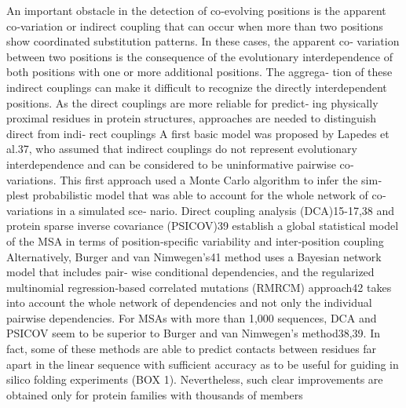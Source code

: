 	An important obstacle in the detection of co‐evolving positions is the apparent co‐variation or indirect coupling that can occur when more than two positions show coordinated substitution patterns. In these cases, the apparent co‐ variation between two positions is the consequence of the evolutionary interdependence of both positions with one or more additional positions. The aggrega‐ tion of these indirect couplings can make it difficult to recognize the directly interdependent positions.
	As the direct couplings are more reliable for predict‐ ing physically proximal residues in protein structures, approaches are needed to distinguish direct from indi‐ rect couplings \cite{de2013emerging}
	A first basic model was proposed by Lapedes et al.37, who assumed that indirect couplings do not represent evolutionary interdependence and can be considered to be uninformative pairwise co‐variations. This first approach used a Monte Carlo algorithm to infer the sim‐ plest probabilistic model that was able to account for the whole network of co‐variations in a simulated sce‐ nario.  \cite{de2013emerging}
	Direct coupling analysis (DCA)15-17,38 and protein sparse inverse covariance (PSICOV)39 establish a global statistical model of the MSA in terms of position‐specific variability and inter‐position coupling \cite{de2013emerging}
	Alternatively, Burger and van Nimwegen's41 method uses a Bayesian network model that includes pair‐ wise conditional dependencies, and the regularized multinomial regression‐based correlated mutations (RMRCM) approach42 takes into account the whole network of dependencies and not only the individual pairwise dependencies. \cite{de2013emerging}
	For MSAs with more than 1,000 sequences, DCA and PSICOV seem to be superior to Burger and van Nimwegen's method38,39. \cite{de2013emerging}
	In fact, some of these methods are able to predict contacts between residues far apart in the linear sequence with sufficient accuracy as to be useful for guiding in silico folding experiments (BOX 1). Nevertheless, such clear improvements are obtained only for protein families with thousands of members \cite{de2013emerging}


